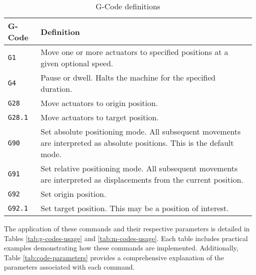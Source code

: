 \begingroup
\setlength{\tabcolsep}{10pt} %
\renewcommand{\arraystretch}{1.5} %
\begin{table}[H]
    \centering
    \caption{G-Code definitions}
    \label{tab:g-definitions}
    \begin{tabular}{p{}p{}}
    \toprule
    G-Code & Definition \\ \midrule
    \texttt{G1} & Move one or more actuators to specified positions at a given optional speed. \\
    \texttt{G4} & Pause or dwell. Halts the machine for the specified duration. \\
    \texttt{G28} & Move actuators to origin position. \\
    \texttt{G28.1} & Move actuators to target position. \\
    \texttt{G90} & Set absolute positioning mode. All subsequent movements are interpreted as absolute positions. This is the default mode. \\
    \texttt{G91} & Set relative positioning mode. All subsequent movements are interpreted as displacements from the current position. \\
    \texttt{G92} & Set origin position. \\
    \texttt{G92.1} & Set target position. This may be a position of interest. \\ \bottomrule
    \end{tabular}
\end{table}
\endgroup

The application of these commands and their respective parameters is detailed in Tables \ref{tab:g-codes-usage} and \ref{tab:m-codes-usage}. Each table includes practical examples demonstrating how these commands are implemented. Additionally, Table \ref{tab:code-parameters} provides a comprehensive explanation of the parameters associated with each command.

